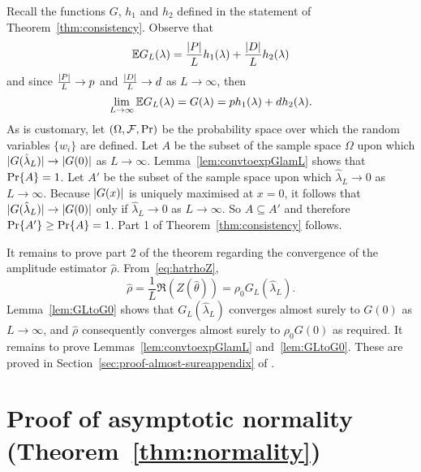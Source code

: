 \documentclass[journal]{IEEEtran}
\begin{document}
Recall the functions $G$, $h_1$ and $h_2$ defined in the statement of Theorem~\ref{thm:consistency}.  Observe that
\[
{\mathbb E} G_L(\lambda) = \frac{{\left\vert P \right\vert}}{L} h_1(\lambda) + \frac{{\left\vert D \right\vert}}{L} h_2(\lambda)
\]
and since $\frac{{\left\vert P \right\vert}}{L} \rightarrow p$ and $\frac{{\left\vert D \right\vert}}{L} \rightarrow d$ as $L \rightarrow \infty$, then
\[
\lim_{L \rightarrow\infty} {\mathbb E} G_L(\lambda) = G(\lambda) = p h_1(\lambda)   +  d h_2(\lambda).
\]
As is customary, let $(\Omega, \mathcal F, {\operatorname{Pr}})$ be the probability space over which the random variables $\{w_i\}$ are defined.  Let $A$ be the subset of the sample space $\Omega$ upon which ${\vert G(\hat{\lambda}_L) \vert} \rightarrow {\vert G(0) \vert}$ as $L\rightarrow\infty$.  Lemma~\ref{lem:convtoexpGlamL} shows that ${\operatorname{Pr}}\{A\} = 1$.  Let $A'$ be the subset of the sample space upon which $\hat{\lambda}_L \rightarrow 0$ as $L\rightarrow \infty$.  Because ${\vert G(x) \vert}$ is uniquely maximised at $x=0$, it follows that ${\vert G(\hat{\lambda}_L) \vert} \rightarrow {\vert G(0) \vert}$ only if $\hat{\lambda}_L \rightarrow 0$ as $L \rightarrow\infty$. So $A \subseteq A'$ and therefore ${\operatorname{Pr}}\{A'\} \geq {\operatorname{Pr}}\{A\} = 1$.  Part 1 of Theorem~\ref{thm:consistency} follows.  

It remains to prove part 2 of the theorem regarding the convergence of the amplitude estimator $\hat{\rho}$.  From~\eqref{eq:hatrhoZ},
\begin{equation}\label{eq:rhoGLZ}
\hat{\rho} = \frac{1}{L}\Re(Z(\hat{\theta})) = \rho_0 G_L(\hat{\lambda}_L).
\end{equation}  
Lemma~\ref{lem:GLtoG0} shows that $G_L(\hat{\lambda}_L)$ converges almost surely to $G(0)$ as $L\rightarrow\infty$, and $\hat{\rho}$ consequently converges almost surely to $\rho_0 G(0)$ as required.  It remains to prove Lemmas~\ref{lem:convtoexpGlamL} and~\ref{lem:GLtoG0}.  These are proved in Section~\ref{sec:proof-almost-sureappendix} of \cite{McKilliam_leastsqPSKpilotsdata_2012appendix}.

\section{Proof of asymptotic normality (Theorem~\ref{thm:normality}) } \label{sec:proof-asympt-norm}
\end{document}
